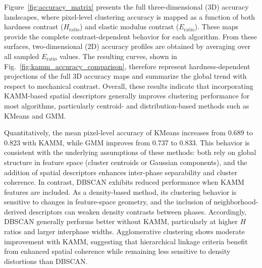 \documentclass[final,3p,times]{elsarticle}
\begin{document}
Figure~\ref{fig:accuracy_matrix} presents the full three-dimensional (3D) accuracy landscapes, where pixel-level clustering accuracy is mapped as a function of both hardness contrast ($H_\mathrm{ratio}$) and elastic modulus contrast ($E_\mathrm{ratio}$). These maps provide the complete contrast-dependent behavior for each algorithm. From these surfaces, two-dimensional (2D) accuracy profiles are obtained by averaging over all sampled $E_\mathrm{ratio}$ values. The resulting curves, shown in Fig.~\ref{fig:kamm_accuracy_comparison}, therefore represent hardness-dependent projections of the full 3D accuracy maps and summarize the global trend with respect to mechanical contrast. Overall, these results indicate that incorporating KAMM-based spatial descriptors generally improves clustering performance for most algorithms, particularly centroid- and distribution-based methods such as KMeans and GMM.

Quantitatively, the mean pixel-level accuracy of KMeans increases from 0.689 to 0.823 with KAMM, while GMM improves from 0.737 to 0.833. This behavior is consistent with the underlying assumptions of these methods: both rely on global structure in feature space (cluster centroids or Gaussian components), and the addition of spatial descriptors enhances inter-phase separability and cluster coherence. In contrast, DBSCAN exhibits reduced performance when KAMM features are included. As a density-based method, its clustering behavior is sensitive to changes in feature-space geometry, and the inclusion of neighborhood-derived descriptors can weaken density contrasts between phases. Accordingly, DBSCAN generally performs better without KAMM, particularly at higher $H$ ratios and larger interphase widths. Agglomerative clustering shows moderate improvement with KAMM, suggesting that hierarchical linkage criteria benefit from enhanced spatial coherence while remaining less sensitive to density distortions than DBSCAN.
\end{document}
